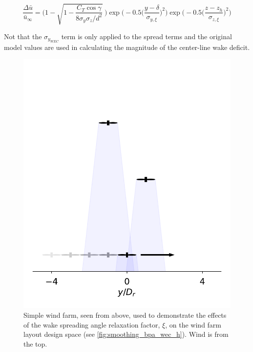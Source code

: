 \documentclass[a4paper]{jpconf}
\begin{document}
\begin{equation}
\frac{\Delta \bar{u}}{\bar{u}_{\infty}} = \Bigg(1-\sqrt{1-\frac{C_T \cos{\gamma}}{8 \sigma_y \sigma_z/d^2}}~\Bigg) \exp{\bigg(-0.5\Big(\frac{y-\delta}{ \sigma_{y,\xi}}\Big)^2\bigg)}\exp{\bigg(-0.5\Big(\frac{z-z_h}{ \sigma_{z,\xi}}\Big)^2\bigg)}
\label{eq:wechapplied}
\end{equation}

Not that the $\sigma_{y_{WEC}}$ term is only applied to the spread terms and the original model values are used in calculating the magnitude of the center-line wake deficit.

\begin{figure}[ht]
	\centering
	\begin{minipage}[t]{0.43\textwidth}
		\centering
		\includegraphics[width=\textwidth, trim={-0.5cm -0.5cm -0.5cm 3.25cm}, clip]{final_images/layouts/3turb-design-space}
		\caption{Simple wind farm, seen from above, used to demonstrate the effects of the wake spreading angle relaxation factor, $\xi$, on the wind farm layout design space (see \cref{fig:smoothing_bpa_wec_h}). Wind is from the top.}
		\label{fig:smoothing_locations_wec_h}

\end{minipage}
\end{figure}
\end{document}

